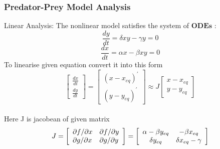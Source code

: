 







\begin{frame}
    \frametitle{Predator-Prey Model Analysis}
Linear Analysis: The nonlinear model satisfies the system of $ \boldsymbol { O D E s } $ :
\begin{equation*}
    \frac { d y } { d t } = \delta x y - \gamma y = 0
\end{equation*}
\begin{equation*}
     \frac { d x } { d t } = \alpha x - \beta x y = 0
\end{equation*}
To linearise given equation convert it into this form
\begin{equation*}
 \left[\begin{array} { c } \frac { d x } { d t } \\ \frac { d y} { d t } \end{array} \right]=  
    \left[ \begin{array} { c } ( x - x_{eq} ) ^ { \prime } \\ ( y - y_{eq} ) ^ { \prime } \end{array} \right] \approx J\left[ \begin{array} { c } x - x_{eq} \\ y - y_{eq} \end{array} \right]\end{equation*} \\
Here J is jacobean of given matrix \\
\begin{equation*}
J = \left[ \begin{array} { l l } \partial f / \partial x & \partial f / \partial y \\ \partial g / \partial x & \partial g / \partial y \end{array} \right] = \left[ \begin{array} { c c } \alpha - \beta y_{eq} & - \beta x_{eq} \\ \delta y_{eq} & \delta x_{eq} - \gamma \end{array} \right]
    
\end{equation*}
\end{frame}

